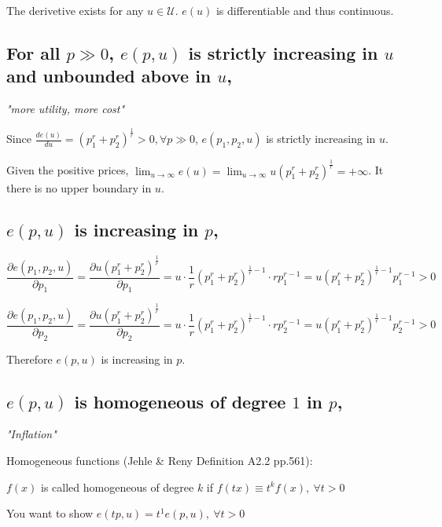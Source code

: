 \documentclass{article}
\begin{document}
The derivetive exists for any $u \in \mathcal{U}$. $e(u)$ is differentiable and thus continuous.


\subsection{For all $p \gg 0$, $e(p, u)$ is strictly increasing in $u$ and unbounded above in $u$,}
\begin{mdframed}[backgroundcolor=blue!20,linecolor=white]
\textit{"more utility, more cost"}

\end{mdframed}


Since $\frac{d e(u)}{d u} = (p_1^{r} + p_2^{r})^{\frac{1}{r}} > 0, \forall p \gg 0$,
$e(p_1,p_2,u)$ is strictly increasing in $u$.

Given the positive prices, $\lim_{u\to\infty} e(u) = \lim_{u\to\infty} u(p_1^{r} + p_2^{r})^{\frac{1}{r}}= + \infty$. It there is no upper boundary in $u$.


\subsection{$e(p, u)$ is increasing in $p$,}

$$\frac{\partial e(p_1,p_2, u)}{\partial p_1} = \frac{\partial u(p_1^{r} + p_2^{r})^{\frac{1}{r}} }{\partial p_1} = u \cdot \frac{1}{r}(p_1^{r} + p_2^{r})^{\frac{1}{r} - 1} \cdot r  p_1^{r-1} =
u (p_1^{r} + p_2^{r})^{\frac{1}{r} - 1} p_1^{r-1} > 0$$

$$\frac{\partial e(p_1,p_2, u)}{\partial p_2} = \frac{\partial u(p_1^{r} + p_2^{r})^{\frac{1}{r}} }{\partial p_2} = u \cdot \frac{1}{r}(p_1^{r} + p_2^{r})^{\frac{1}{r} - 1} \cdot r  p_2^{r-1} =
u (p_1^{r} + p_2^{r})^{\frac{1}{r} - 1} p_2^{r-1} > 0$$

Therefore $e(p, u)$ is increasing in $p$.


\subsection{$e(p, u)$ is homogeneous of degree $1$ in $p$,}

\begin{mdframed}[backgroundcolor=blue!20,linecolor=white]

\textit{"Inflation"}

Homogeneous functions (Jehle \& Reny Definition A2.2 pp.561):

$f(x)$ is called homogeneous of degree $k$ if $f(tx) \equiv t^kf(x),\ \forall t > 0$

You want to show $e(tp, u) = t^1e(p, u),\ \forall t > 0$
\end{mdframed}
\end{document}
